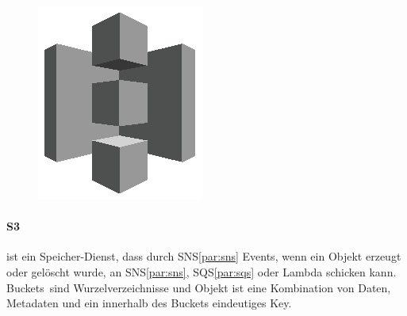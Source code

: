 \documentclass[
12pt,
english,
ngerman,
headsepline,
twoside,
openright,
numbers=noenddot,version=first
]{scrreprt}
\begin{document}
\begin{figure}
	\includegraphics[width=0.9\linewidth]{./pics/aws/Storage_GRAYSCALE_AmazonS3.eps}
\end{figure}
\paragraph{\acrfull{S3}} ist ein Speicher-Dienst, dass durch \acrshort{SNS}\ref{par:sns} Events, wenn ein Objekt erzeugt oder gelöscht wurde, an \acrshort{SNS}\ref{par:sns}, \acrfull{SQS}\ref{par:sqs} oder Lambda schicken kann. \glqq Buckets\grqq\ sind Wurzelverzeichnisse und Objekt ist eine Kombination von Daten, Metadaten und ein innerhalb des Buckets eindeutiges Key.
\end{document}

